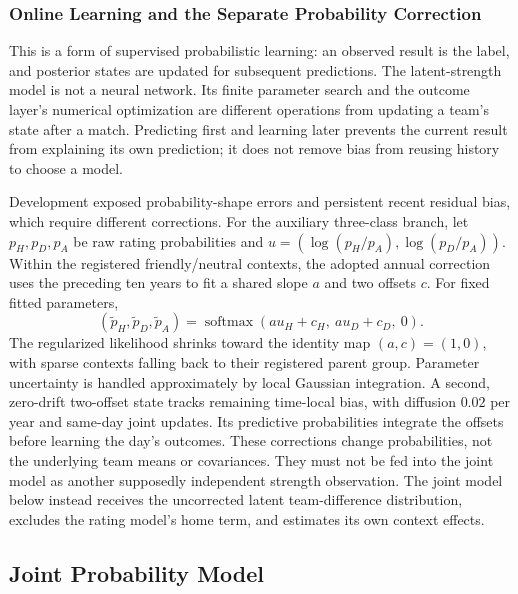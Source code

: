 \subsubsection{Online Learning and the Separate Probability Correction}

This is a form of supervised probabilistic learning: an observed result is the label, and posterior states are updated for subsequent predictions. The latent-strength model is not a neural network. Its finite parameter search and the outcome layer's numerical optimization are different operations from updating a team's state after a match. Predicting first and learning later prevents the current result from explaining its own prediction; it does not remove bias from reusing history to choose a model.

Development exposed probability-shape errors and persistent recent residual bias, which require different corrections. For the auxiliary three-class branch, let $p_H,p_D,p_A$ be raw rating probabilities and $u=(\log(p_H/p_A),\log(p_D/p_A))$. Within the registered friendly/neutral contexts, the adopted annual correction uses the preceding ten years to fit a shared slope $a$ and two offsets $c$. For fixed fitted parameters,
\begin{equation}
 (\widetilde p_H,\widetilde p_D,\widetilde p_A)
 =\operatorname{softmax}(a u_H+c_H,\ a u_D+c_D,\ 0).
 \label{eq:shape-correction}
\end{equation}
The regularized likelihood shrinks toward the identity map $(a,c)=(1,0)$, with sparse contexts falling back to their registered parent group. Parameter uncertainty is handled approximately by local Gaussian integration. A second, zero-drift two-offset state tracks remaining time-local bias, with diffusion $0.02$ per year and same-day joint updates. Its predictive probabilities integrate the offsets before learning the day's outcomes. These corrections change probabilities, not the underlying team means or covariances. They must not be fed into the joint model as another supposedly independent strength observation. The joint model below instead receives the uncorrected latent team-difference distribution, excludes the rating model's home term, and estimates its own context effects.

\subsection{Joint Probability Model}
\label{sec:joint-method}

